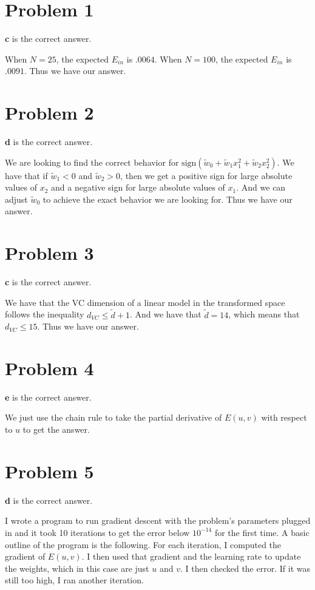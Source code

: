 \documentclass{article}
\begin{document}
\section*{Problem 1}
\textbf{c} is the correct answer.

\noindent When $N = 25$, the expected $E_{in}$ is $.0064$. When $N = 100$,
the expected $E_{in}$ is $.0091$. Thus we have our answer.

\section*{Problem 2}
\textbf{d} is the correct answer.

\noindent We are looking to find the correct behavior for
$\text{sign}(\tilde{w}_0 + \tilde{w}_1x_1^2 + \tilde{w}_2x_2^2)$. We have
that if $\tilde{w}_1 < 0$ and $\tilde{w}_2 > 0$, then we get a positive
sign for large absolute values of $x_2$ and a negative sign for large absolute
values of $x_1$. And we can adjust $\tilde{w}_0$ to achieve the exact
behavior we are looking for. Thus we have our answer.

\section*{Problem 3}
\textbf{c} is the correct answer.

\noindent We have that the VC dimension of a linear model in the transformed
space follows the inequality $d_{VC} \leq \tilde{d} + 1$. And we have that
$\tilde{d} = 14$, which means that $d_{VC} \leq 15$. Thus we have our answer.

\section*{Problem 4}
\textbf{e} is the correct answer.

\noindent We just use the chain rule to take the partial derivative of
$E(u,v)$ with respect to $u$ to get the answer.

\section*{Problem 5}
\textbf{d} is the correct answer.

\noindent I wrote a program to run gradient descent with the problem's
parameters plugged in and it took 10 iterations to get the error below $10^{-14}$
for the first time. A basic outline of the program is the following. For
each iteration, I computed the gradient of $E(u,v)$. I then used that
gradient and the learning rate to update the weights, which in this case
are just $u$ and $v$. I then checked the error. If it was still too high,
I ran another iteration.
\end{document}
